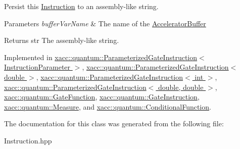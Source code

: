 Persist this \hyperlink{a02460}{Instruction} to an assembly-\/like string.


\begin{DoxyParams}{Parameters}
{\em buffer\+Var\+Name} & The name of the \hyperlink{a02444}{Accelerator\+Buffer} \\
\hline
\end{DoxyParams}
\begin{DoxyReturn}{Returns}
str The assembly-\/like string. 
\end{DoxyReturn}


Implemented in \hyperlink{a01280_aaccc4a20d58d2ac5c31abe7e325b8f77}{xacc\+::quantum\+::\+Parameterized\+Gate\+Instruction$<$ Instruction\+Parameter $>$}, \hyperlink{a01280_aaccc4a20d58d2ac5c31abe7e325b8f77}{xacc\+::quantum\+::\+Parameterized\+Gate\+Instruction$<$ double $>$}, \hyperlink{a01280_aaccc4a20d58d2ac5c31abe7e325b8f77}{xacc\+::quantum\+::\+Parameterized\+Gate\+Instruction$<$ int $>$}, \hyperlink{a01280_aaccc4a20d58d2ac5c31abe7e325b8f77}{xacc\+::quantum\+::\+Parameterized\+Gate\+Instruction$<$ double, double $>$}, \hyperlink{a01272_aa1950776ae84bad2d0795a0441f910e7}{xacc\+::quantum\+::\+Gate\+Function}, \hyperlink{a01276_a089a5da67ff40ac1a6f56e64589822d9}{xacc\+::quantum\+::\+Gate\+Instruction}, \hyperlink{a01312_a1c51a5d68294dcb2ba1a9fbea63a730f}{xacc\+::quantum\+::\+Measure}, and \hyperlink{a01304_aca7a5f849fece6fc28a904efee9a3370}{xacc\+::quantum\+::\+Conditional\+Function}.



The documentation for this class was generated from the following file\+:\begin{DoxyCompactItemize}
\item 
Instruction.\+hpp\end{DoxyCompactItemize}
